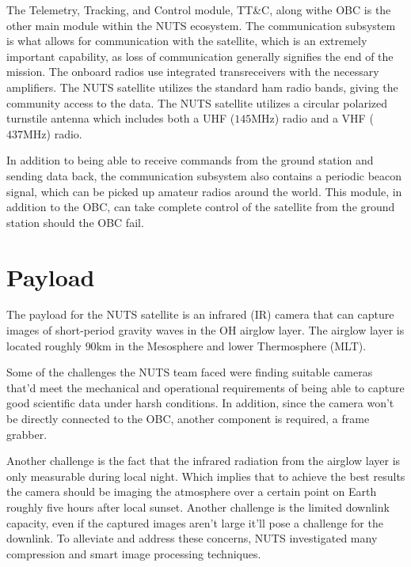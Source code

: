 \documentclass[12pt, a4paper]{report}
\begin{document}
The Telemetry, Tracking, and Control module, TT\&C, along withe OBC is the other main module within the NUTS ecosystem. The communication subsystem is what allows for communication with the satellite, which is an extremely important capability, as loss of communication generally signifies the end of the mission. The onboard radios use integrated transreceivers with the necessary amplifiers. The NUTS satellite utilizes the standard ham radio bands, giving the community access to the data. The NUTS satellite utilizes a circular polarized turnstile antenna which includes both a UHF (\(145 \unit{\mega\hertz}\)) radio and a VHF (\(437 \unit{\mega\hertz}\)) radio\cite{overview}\cite{power_distribution}.

In addition to being able to receive commands from the ground station and sending data back, the communication subsystem also contains a periodic beacon signal, which can be picked up amateur radios around the world. This module, in addition to the OBC, can take complete control of the satellite from the ground station should the OBC fail\cite{power_distribution}.


\section{Payload}

The payload for the NUTS satellite is an infrared (IR) camera that can capture images of short-period gravity waves in the OH airglow layer. The airglow layer is located roughly \(90 \unit{\kilo\meter}\) in the Mesosphere and lower Thermosphere (MLT)\cite{overview}.

Some of the challenges the NUTS team faced were finding suitable cameras that'd meet the mechanical and operational requirements of being able to capture good scientific data under harsh conditions\cite{overview}. In addition, since the camera won't be directly connected to the OBC, another component is required, a frame grabber. 

Another challenge is the fact that the infrared radiation from the airglow layer is only measurable during local night. Which implies that to achieve the best results the camera should be imaging the atmosphere over a certain point on Earth roughly five hours after local sunset\cite{overview}. Another challenge is the limited downlink capacity, even if the captured images aren't large it'll pose a challenge for the downlink. To alleviate and address these concerns, NUTS investigated many compression and smart image processing techniques. 
\end{document}

